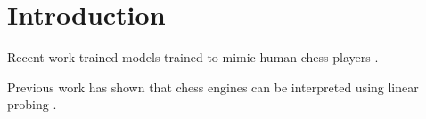 \section{Introduction}

Recent work trained models trained to mimic human chess players \cite{McIlroy-Young2020AligningSA,Tang2024Maia-2}.

Previous work has shown that chess engines can be interpreted using linear probing \cite{McGrath2022Acquisition}.
